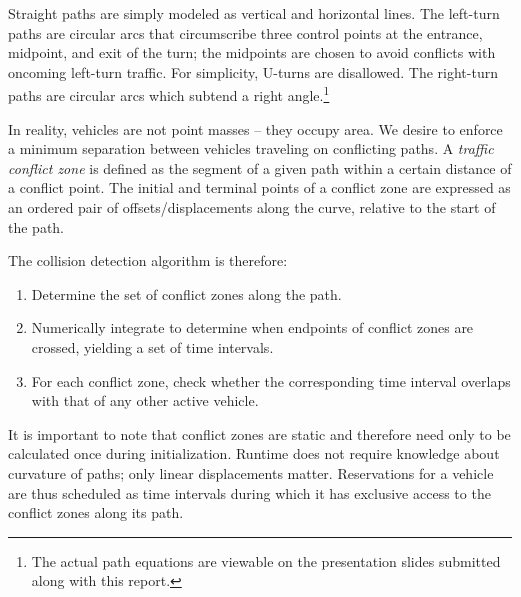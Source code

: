 Straight paths are simply modeled as vertical and horizontal lines.
The left-turn paths are circular arcs that circumscribe three control
points at the entrance, midpoint, and exit of the turn; the midpoints
are chosen to avoid conflicts with oncoming left-turn traffic.
For simplicity, U-turns are disallowed.  The right-turn paths are
circular arcs which subtend a right angle.\footnote{The actual path
equations are viewable on the presentation slides submitted along with
this report.}

In reality, vehicles are not point masses -- they occupy area.
We desire to enforce a minimum separation between vehicles traveling
on conflicting paths.  A \emph{traffic conflict zone} is defined as the
segment of a given path within a certain distance of a conflict point.
The initial and terminal points of a conflict zone are expressed as an
ordered pair of offsets/displacements along the curve, relative to the
start of the path.

The collision detection algorithm is therefore:
\begin{enumerate}
\setlength{\itemsep}{0pt}
\setlength{\parskip}{0pt}
\item Determine the set of conflict zones along the path.
\item Numerically integrate to determine when endpoints of conflict
	zones are crossed, yielding a set of time intervals.
\item For each conflict zone, check whether the corresponding time
	interval overlaps with that of any other active vehicle.
\end{enumerate}

It is important to note that conflict zones are static and therefore
need only to be calculated once during initialization.  Runtime does
not require knowledge about curvature of paths; only linear
displacements matter.  Reservations for a vehicle are thus scheduled
as time intervals during which it has exclusive access to the conflict
zones along its path.
